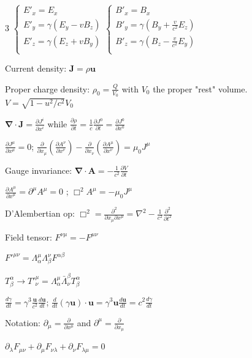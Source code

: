 \documentclass[a4paper,twoside]{article}
\begin{document}
\begin{multicols*}{3}
\(
\begin{cases}
    E'_x = E_x \\
    E'_y = \gamma (E_y - v B_z) \\
    E'_z = \gamma (E_z + v B_y) \\
\end{cases}
\begin{cases}
    B'_x = B_x \\
    B'_y = \gamma (B_y + \frac{v}{c^2} E_z) \\
    B'_z = \gamma (B_z - \frac{v}{c^2} E_y) \\
\end{cases}
\)

Current density:
\(\bm J = \rho \bm u\)

Proper charge density:
\(\rho_0 = \frac{Q}{V_0}\)
 with \(V_0\) the proper "rest" volume.
\(V = \sqrt{1 - u^2/c^2}V_0\)

\( \bm \nabla \cdot \bm J = \frac{\partial J^{i}}{\partial x^i} \) while \(\frac{\partial \rho}{\partial t} = \frac{1}{c} \frac{\partial J^0}{\partial t } = \frac{\partial J^0}{\partial x^0}\)

\(\frac{\partial J^\mu}{\partial x^\mu} = 0\);
\(\frac{\partial}{\partial x_\mu }(\frac{\partial A^\nu}{\partial x^\nu})-\frac{\partial}{\partial x_\nu }(\frac{\partial A^\mu}{\partial x^\nu}) = \mu_0 J^\mu\)

Gauge invariance:
\(\bm \nabla \cdot \bm A = -\frac{1}{c^2} \frac{\partial V}{\partial t}\)

\(\frac{\partial A^\mu}{\partial x^\mu} = \partial^\mu A^\mu = 0\) ; \(\Box^2 A^\mu = - \mu_0 J^\mu\)

D'Alembertian op:
\(\Box^2 = \frac{\partial^2}{\partial x_\mu \partial x^\mu} = \nabla^2 -\frac{1}{c^2} \frac{\partial^2}{\partial t^2} \)

Field tensor:
\(F^{\nu\mu} = - F^{\mu\nu}\)

\(F'^{\mu\nu} = \Lambda^\mu_\alpha \Lambda^\nu_\beta F^{\alpha\beta}\)

\(T^\alpha_\beta \to T'^\mu_\nu = \Lambda^\mu_\alpha \bar{\Lambda}_\nu^\beta T^{\alpha}_{\beta}\)

\(\frac{d \gamma}{d t} =\gamma^3 \frac{\bm u}{c^2} \frac{d \bm u}{dt}\);
\(
\frac{d}{dt} (\gamma \bm u) \cdot \bm u = \gamma^3 \bm u \frac{d \bm u}{dt} = c^2 \frac{d\gamma}{dt} \)

Notation: \(\partial_\mu = \frac{\partial}{\partial x^\mu}\) and \(\partial^\mu = \frac{\partial}{\partial x_\mu}\)


\(\partial_\lambda F_{\mu\nu} + \partial_\mu F_{\nu\lambda} + \partial_\nu F_{\lambda\mu} = 0 \)


\end{multicols*}
\end{document}
